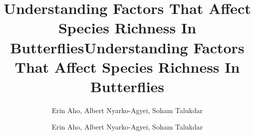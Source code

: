 \documentclass[12pt,a4paper,twocolumn]{article}
\author{Erin Aho,  Albert Nyarko-Agyei,  Soham Talukdar}
\title{Understanding Factors That Affect Species Richness In Butterflies}
\begin{document}
\title{Understanding Factors That Affect Species Richness In Butterflies}
\author{Erin Aho,  Albert Nyarko-Agyei,  Soham Talukdar}
\end{document}
